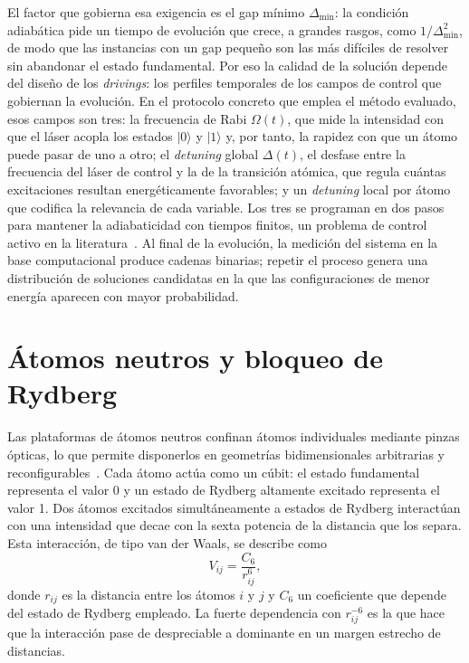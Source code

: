 El factor que gobierna esa exigencia es el gap mínimo $\Delta_{\min}$: la
condición adiabática pide un tiempo de evolución que crece, a grandes
rasgos, como $1/\Delta_{\min}^2$, de modo que las instancias con un gap
pequeño son las más difíciles de resolver sin abandonar el estado
fundamental. Por eso la calidad de la solución depende del diseño de los
\emph{drivings}: los perfiles temporales de los campos de control que
gobiernan la evolución. En el protocolo concreto que emplea el método
evaluado, esos campos son tres: la frecuencia de Rabi $\Omega(t)$, que
mide la intensidad con que el láser acopla los estados $|0\rangle$ y
$|1\rangle$ y, por tanto, la rapidez con que un átomo puede pasar de uno a
otro; el \textit{detuning} global $\Delta(t)$, el desfase entre la
frecuencia del láser de control y la de la transición atómica, que regula
cuántas excitaciones resultan energéticamente favorables; y un
\textit{detuning} local por átomo que codifica la relevancia de cada
variable. Los tres se programan en dos pasos para mantener la
adiabaticidad con tiempos finitos, un problema de control activo en la
literatura~\cite{ding2021, arribas2025}. Al final de
la evolución, la medición del sistema en la base computacional produce
cadenas binarias; repetir el proceso genera una distribución de
soluciones candidatas en la que las configuraciones de menor energía
aparecen con mayor probabilidad.

\section{Átomos neutros y bloqueo de Rydberg}
\label{sec:mt-rydberg}

Las plataformas de átomos neutros confinan átomos individuales
mediante pinzas ópticas, lo que permite disponerlos en geometrías
bidimensionales arbitrarias y reconfigurables~\cite{henriet2020}. Cada
átomo actúa como un cúbit: el estado fundamental representa el valor
0 y un estado de Rydberg altamente excitado representa el valor 1.
Dos átomos excitados simultáneamente a estados de Rydberg
interactúan con una intensidad que decae con la sexta potencia de la
distancia que los separa. Esta interacción, de tipo van der Waals, se
describe como
\begin{equation}
  \label{eq:vdw}
  V_{ij} = \frac{C_6}{r_{ij}^{6}},
\end{equation}
donde $r_{ij}$ es la distancia entre los átomos $i$ y $j$ y $C_6$ un
coeficiente que depende del estado de Rydberg empleado. La fuerte
dependencia con $r_{ij}^{-6}$ es la que hace que la interacción pase de
despreciable a dominante en un margen estrecho de distancias.

